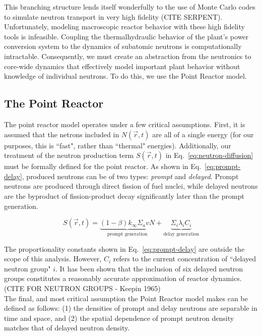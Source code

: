 \documentclass[review,onefignum,onetabnum]{siamart171218}
\begin{document}
This branching structure lends itself wonderfully to the use of
Monte Carlo codes to simulate neutron transport in very high fidelity (CITE SERPENT).
Unfortunately, modeling macroscopic reactor behavior with these high fidelity
tools is infeasible. Coupling the thermalhydraulic behavior of the plant's
power conversion system to the dynamics of subatomic neutrons is
computationally intractable. Consequently, we must create an abstraction from
the neutronics to core-wide dynamics that effectively model important plant
behavior without knowledge of individual neutrons. To do this, we use the
Point Reactor model.

\subsection{The Point Reactor}
The point reactor model operates under a few critical assumptions. First,
it is assumed that the netrons included in $N(\vec{r}, t)$ are all of a single
energy (for our purposes, this is ``fast", rather than ``thermal" energies).
Additionally, our treatment of the neutron production term $S(\vec{r}, t)$
in Eq.~\cref{eq:neutron-diffusion} must be formally defined for the point
reactor. As shown in Eq.~\cref{eq:prompt-delay}, produced neutrons can be of
two types: \emph{prompt} and \emph{delayed}. Prompt neutrons are produced
through direct fission of fuel nuclei, while delayed neutrons are the
byproduct of fission-product decay significantly later than the prompt
generation.

\begin{equation}
  S(\vec{r}, t) = \underbrace{(1-\beta)k_{\infty}\Sigma_avN}_{\text{prompt generation}} + \underbrace{\Sigma_i\lambda_iC_i}_{\text{delay generation}}
  \label{eq:prompt-delay}
\end{equation}

The proportionality constants shown in Eq.~\cref{eq:prompt-delay} are outside
the scope of this analysis. However, $C_i$ refers to the current concentration
of ``delayed neutron group" $i$. It has been shown that the inclusion of six
delayed neutron groups constitutes a reasonably accurate approximation of reactor
dynamics. (CITE FOR NEUTRON GROUPS - Keepin 1965) \\

The final, and most critical assumption the Point Reactor model makes can be
defined as follows: (1) the densities of prompt and delay neutrons are separable
in time and space, and (2) the spatial dependence of prompt neutron density matches
that of delayed neutron density. \\
\end{document}
